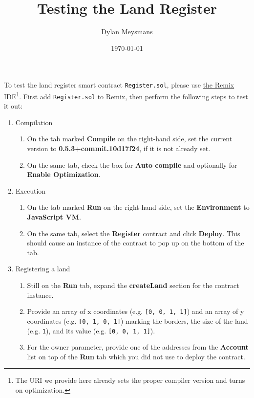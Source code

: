 \documentclass[10pt,twoside,a4]{scrartcl}%
\begin{document}
%

\title{Testing the Land Register}%
\author{Dylan Meysmans}%
\date{\today}%
\maketitle%

To test the land register smart contract \texttt{Register.sol}, please use \href{https://remix.ethereum.org/#optimize=true&version=soljson-v0.5.3+commit.10d17f24.js}{the Remix IDE}\footnote{The URI we provide here already sets the proper compiler version and turns on optimization.}.
First add \texttt{Register.sol} to Remix, then perform the following steps to test it out:

\begin{enumerate}
    \item Compilation
    \begin{enumerate}
        \item On the tab marked \textbf{Compile} on the right-hand side, set the current version to \textbf{0.5.3+commit.10d17f24}, if it is not already set.
        \item On the same tab, check the box for \textbf{Auto compile} and optionally for \textbf{Enable Optimization}. 
    \end{enumerate}
    \item Execution
    \begin{enumerate}
        \item On the tab marked \textbf{Run} on the right-hand side, set the \textbf{Environment} to \textbf{JavaScript VM}.
        \item On the same tab, select the \textbf{Register} contract and click \textbf{Deploy}. This should cause an instance of the contract to pop up on the bottom of the tab.
    \end{enumerate}
    \item Registering a land
    \begin{enumerate}
        \item Still on the \textbf{Run} tab, expand the \textbf{createLand} section for the contract instance.
        \item Provide an array of x coordinates (e.g. \texttt{[0, 0, 1, 1]}) and an array of y coordinates (e.g. \texttt{[0, 1, 0, 1]}) marking the borders, the size of the land (e.g. \texttt{1}), and its value (e.g. \texttt{[0, 0, 1, 1]}).
        \item For the owner parameter, provide one of the addresses from the \textbf{Account} list on top of the \textbf{Run} tab which you did not use to deploy the contract.

\end{enumerate}
\end{enumerate}
\end{document}
